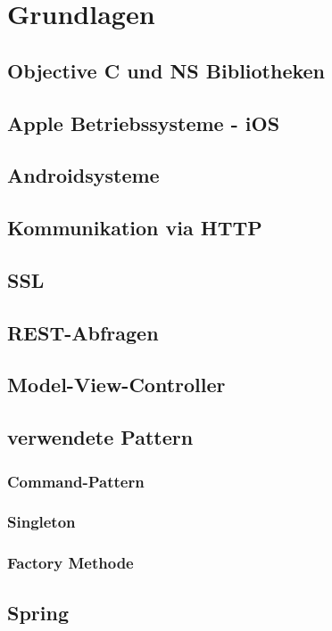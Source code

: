 \chapter{Grundlagen}
\lipsum

\section{Objective C und NS Bibliotheken}
\lipsum

\cite{Knuth:1998:ACP:280635}

\section{Apple Betriebssysteme - iOS}
\section{Androidsysteme}
\section{Kommunikation via HTTP}
\section{SSL}
\section{REST-Abfragen}
\section{Model-View-Controller}
\section{verwendete Pattern}
\subsection{Command-Pattern}
\subsection{Singleton}
\subsection{Factory Methode}
\section{Spring}